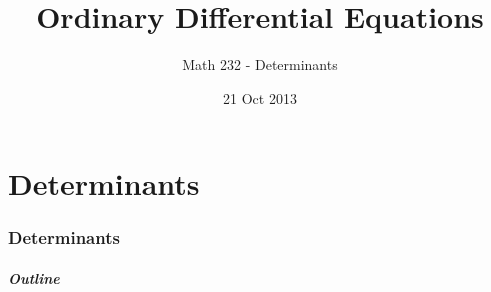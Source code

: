 \part{Determinants}
\section{Determinants}

\title{Ordinary Differential Equations}
\subtitle{Math 232 - Determinants}
\date{21 Oct 2013}

\begin{frame}
  \titlepage
\end{frame}

\begin{frame}
  \frametitle{Outline}
  \tableofcontents[currentsection]
\end{frame}


